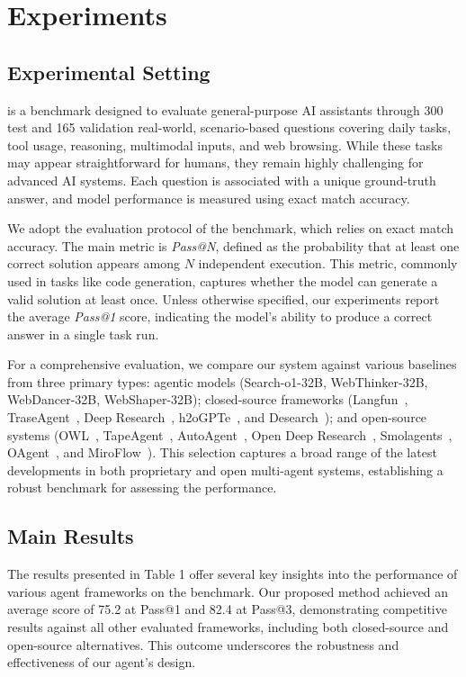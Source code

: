 \section{Experiments} \label{sec:eval}
\subsection{Experimental Setting}
\gaia{}\cite{mialon2023gaia} is a benchmark designed to evaluate general-purpose AI assistants through 300 test and 165 validation real-world, scenario-based questions covering daily tasks, tool usage, reasoning, multimodal inputs, and web browsing. While these tasks may appear straightforward for humans, they remain highly challenging for advanced AI systems. Each question is associated with a unique ground-truth answer, and model performance is measured using exact match accuracy.

We adopt the evaluation protocol of the \gaia{} benchmark, which relies on exact match accuracy. The main metric is \textit{Pass@N}, defined as the probability that at least one correct solution appears among $N$ independent execution. This metric, commonly used in tasks like code generation, captures whether the model can generate a valid solution at least once. Unless otherwise specified, our experiments report the average \textit{Pass@1} score, indicating the model’s ability to produce a correct answer in a single task run.

For a comprehensive evaluation, we compare our system against various baselines from three primary types: agentic models (Search-o1-32B, WebThinker-32B, WebDancer-32B, WebShaper-32B); closed-source frameworks (Langfun~\cite{Peng_Langfun_2023}, TraseAgent~\cite{trase2024trase}, Deep Research~\cite{deepresearch}, h2oGPTe~\cite{h2oGPTe2024h2oGPTe}, and Desearch~\cite{desearch}); and open-source systems (OWL~\cite{owl2025}, TapeAgent~\cite{bahdanau2024tapeagentsholisticframeworkagent}, AutoAgent~\cite{tang2025autoagent}, Open Deep Research~\cite{opendeepresearch}, Smolagents~\cite{smolagents}, OAgent~\cite{oagent}, and MiroFlow~\cite{miroflow}). This selection captures a broad range of the latest developments in both proprietary and open multi-agent systems, establishing a robust benchmark for assessing the performance.

\subsection{Main Results}
The results presented in Table 1 offer several key insights into the performance of various agent frameworks on the \gaia{} benchmark. Our proposed method achieved an average score of 75.2 at Pass@1 and 82.4 at Pass@3, demonstrating competitive results against all other evaluated frameworks, including both closed-source and open-source alternatives. This outcome underscores the robustness and effectiveness of our agent's design.

